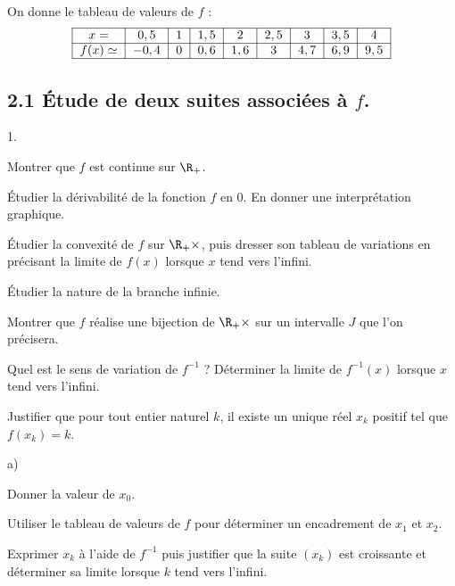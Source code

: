 \documentclass[11pt]{article}%
\begin{document}
\noindent On donne le tableau de valeurs de $f$ :
\[
\begin{tabular}{|c|c|c|c|c|c|c|c|c|}
\hline
$x = $ & $0,5$ & $1$ & $1,5$ & $2$ & $2,5$ & $3$ & $3,5$ & $4$ \\
\hline
$f(x)\simeq $ & $-0,4$ & $0$ & $0,6$ & $1,6$ & $3$ & $4,7$ & $6,9$ &
$9,5$
\\
\hline
\end{tabular}
\]

\subsection*{2.1 Étude de deux suites associées à $f$.}

\begin{noliste}{1.}
 \setlength{\itemsep}{4mm}
\item Montrer que $f$ est continue sur $\R_{+}$.

\item Étudier la dérivabilité de la fonction $f$ en 0. En donner une
interprétation graphique.

\item Étudier la convexité de $f$ sur $\R_{+}{\times }$, puis
dresser son tableau de variations en précisant la limite de $f(x)$
lorsque $x $ tend vers l'infini.

\item Étudier la nature de la branche infinie.

\item Montrer que $f$ réalise une bijection de $\R_{+}{\times }$
sur un intervalle $J$ que l'on précisera.

\item Quel est le sens de variation de $f^{-1}$ ? Déterminer la limite
de $f^{-1}(x)$ lorsque $x$ tend vers l'infini.

\item Justifier que pour tout entier naturel $k$, il existe un unique
réel $x_{k}$ positif tel que $f(x_{k}) = k$.

\begin{noliste}{a)}
 \setlength{\itemsep}{2mm}
\item Donner la valeur de $x_{0}$.

\item Utiliser le tableau de valeurs de $f$ pour déterminer un
encadrement
de $x_{1}$ et $x_{2}$.

\item Exprimer $x_{k}$ à l'aide de $f^{-1}$ puis justifier que la suite
$
(x_{k})$ est croissante et déterminer sa limite lorsque $k$ tend vers
l'infini.
\end{noliste}


\end{noliste}
\end{document}
